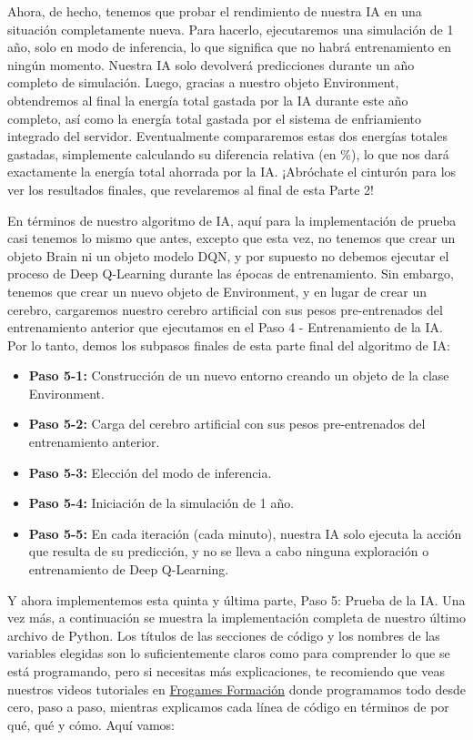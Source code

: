\documentclass[
]{book}
\providecommand{\tightlist}{%
  \setlength{\itemsep}{0pt}\setlength{\parskip}{0pt}}
\begin{document}
Ahora, de hecho, tenemos que probar el rendimiento de nuestra IA en una situación completamente nueva. Para hacerlo, ejecutaremos una simulación de 1 año, solo en modo de inferencia, lo que significa que no habrá entrenamiento en ningún momento. Nuestra IA solo devolverá predicciones durante un año completo de simulación. Luego, gracias a nuestro objeto Environment, obtendremos al final la energía total gastada por la IA durante este año completo, así como la energía total gastada por el sistema de enfriamiento integrado del servidor. Eventualmente compararemos estas dos energías totales gastadas, simplemente calculando su diferencia relativa (en \%), lo que nos dará exactamente la energía total ahorrada por la IA. ¡Abróchate el cinturón para los ver los resultados finales, que revelaremos al final de esta Parte 2!

En términos de nuestro algoritmo de IA, aquí para la implementación de prueba casi tenemos lo mismo que antes, excepto que esta vez, no tenemos que crear un objeto Brain ni un objeto modelo DQN, y por supuesto no debemos ejecutar el proceso de Deep Q-Learning durante las épocas de entrenamiento. Sin embargo, tenemos que crear un nuevo objeto de Environment, y en lugar de crear un cerebro, cargaremos nuestro cerebro artificial con sus pesos pre-entrenados del entrenamiento anterior que ejecutamos en el Paso 4 - Entrenamiento de la IA. Por lo tanto, demos los subpasos finales de esta parte final del algoritmo de IA:

\begin{itemize}
\tightlist
\item
  \textbf{Paso 5-1:} Construcción de un nuevo entorno creando un objeto de la clase Environment.
\item
  \textbf{Paso 5-2:} Carga del cerebro artificial con sus pesos pre-entrenados del entrenamiento anterior.
\item
  \textbf{Paso 5-3:} Elección del modo de inferencia.
\item
  \textbf{Paso 5-4:} Iniciación de la simulación de 1 año.
\item
  \textbf{Paso 5-5:} En cada iteración (cada minuto), nuestra IA solo ejecuta la acción que resulta de su predicción, y no se lleva a cabo ninguna exploración o entrenamiento de Deep Q-Learning.
\end{itemize}

Y ahora implementemos esta quinta y última parte, Paso 5: Prueba de la IA. Una vez más, a continuación se muestra la implementación completa de nuestro último archivo de Python. Los títulos de las secciones de código y los nombres de las variables elegidas son lo suficientemente claros como para comprender lo que se está programando, pero si necesitas más explicaciones, te recomiendo que veas nuestros videos tutoriales en \href{https://cursos.frogamesformacion.com/courses/ia-aplicada-negocios?et=paid\&ref=846b3f\&coupon=frogames30}{Frogames Formación} donde programamos todo desde cero, paso a paso, mientras explicamos cada línea de código en términos de por qué, qué y cómo. Aquí vamos:
\end{document}
